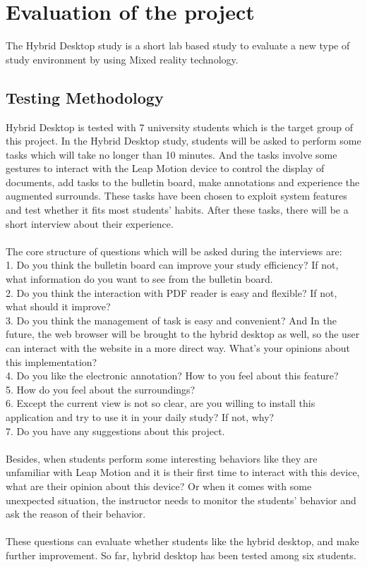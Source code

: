 
\chapter{Evaluation of the project} %
The Hybrid Desktop study is a short lab based study to evaluate a new type of study environment by using Mixed reality technology. 
\label{Chapter7} %
\section{Testing Methodology}
Hybrid Desktop is tested with 7 university students which is the target group of this project. In the Hybrid Desktop study, students will be asked to perform some tasks which will take no longer than 10 minutes. And the tasks involve some gestures to interact with the Leap Motion device to control the display of documents, add tasks to the bulletin board, make annotations and experience the augmented surrounds. These tasks have been chosen to exploit system features and test whether it fits most students’ habits. After these tasks, there will be a short interview about their experience. 
\\
\\
The core structure of questions which will be asked during the interviews are: 
\\
1. Do you think the bulletin board can improve your study efficiency? If not, what information do you want to see from the bulletin board. 
\\
2. Do you think the interaction with PDF reader is easy and flexible? If not, what should it improve? 
\\
3. Do you think the management of task is easy and convenient? And In the future, the web browser will be brought to the hybrid desktop as well, so the user can interact with the website in a more direct way. What’s your opinions about this implementation? 
\\
4. Do you like the electronic annotation? How to you feel about this feature? 
\\
5. How do you feel about the surroundings? 
\\
6. Except the current view is not so clear, are you willing to install this application and try to use it in your daily study? If not, why? 
\\
7. Do you have any suggestions about this project.
\\
\\
Besides, when students perform some interesting behaviors like they are unfamiliar with Leap Motion and it is their first time to interact with this device, what are their opinion about this device? Or when it comes with some unexpected situation, the instructor needs to monitor the students’ behavior and ask the reason of their behavior.
\\
\\
These questions can evaluate whether students like the hybrid desktop, and make further improvement. So far, hybrid desktop has been tested among six students.

